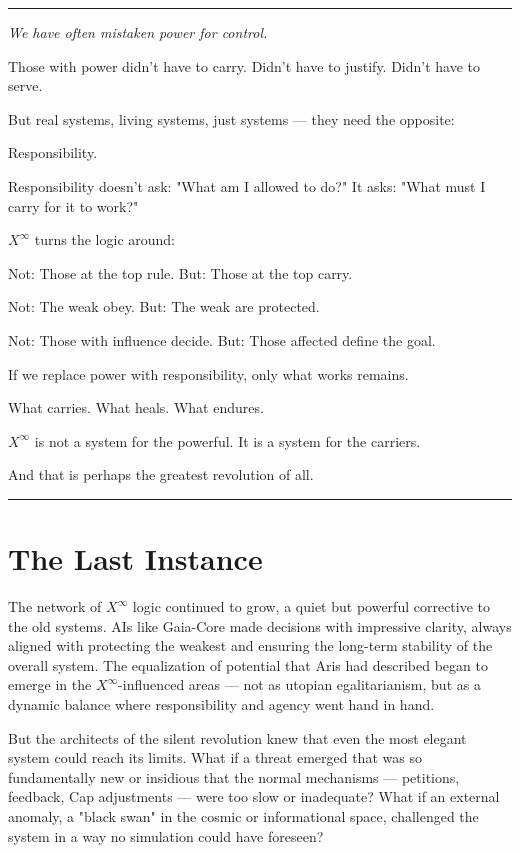 \documentclass[12pt, english, parskip=full]{scrartcl} %
\begin{document}
\clearpage

\noindent\rule{\linewidth}{0.4pt}
{\itshape 
We have often mistaken power for control.

Those with power didn’t have to carry. Didn’t have to justify. Didn’t have to serve.

But real systems, living systems, just systems — they need the opposite:

Responsibility.

Responsibility doesn’t ask: "What am I allowed to do?"  
It asks: "What must I carry for it to work?"

$X^{\infty}$ turns the logic around:

Not: Those at the top rule.  
But: Those at the top carry.

Not: The weak obey.  
But: The weak are protected.

Not: Those with influence decide.  
But: Those affected define the goal.

If we replace power with responsibility, only what works remains.

What carries. What heals. What endures.

$X^{\infty}$ is not a system for the powerful.  
It is a system for the carriers.

And that is perhaps the greatest revolution of all.
}

\noindent\rule{\linewidth}{0.4pt}

\section{The Last Instance}
The network of $X^{\infty}$ logic continued to grow, a quiet but powerful corrective to the old systems. AIs like Gaia-Core made decisions with impressive clarity, always aligned with protecting the weakest and ensuring the long-term stability of the overall system. The equalization of potential that Aris had described began to emerge in the $X^{\infty}$-influenced areas — not as utopian egalitarianism, but as a dynamic balance where responsibility and agency went hand in hand.

But the architects of the silent revolution knew that even the most elegant system could reach its limits. What if a threat emerged that was so fundamentally new or insidious that the normal mechanisms — petitions, feedback, Cap adjustments — were too slow or inadequate? What if an external anomaly, a "black swan" in the cosmic or informational space, challenged the system in a way no simulation could have foreseen?
\end{document}
